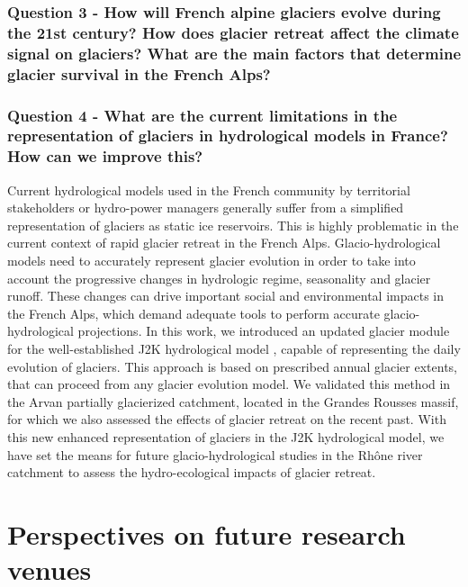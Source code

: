 \subsubsection{Question 3 - How will French alpine glaciers evolve during the 21st century? How does glacier retreat affect the climate signal on glaciers? What are the main factors that determine glacier survival in the French Alps?}

\blindtext

\subsubsection{Question 4 - What are the current limitations in the representation of glaciers in hydrological models in France? How can we improve this?}

Current hydrological models used in the French community by territorial stakeholders or hydro-power managers generally suffer from a simplified representation of glaciers as static ice reservoirs. This is highly problematic in the current context of rapid glacier retreat in the French Alps. Glacio-hydrological models need to accurately represent glacier evolution in order to take into account the progressive changes in hydrologic regime, seasonality and glacier runoff. These changes can drive important social and environmental impacts in the French Alps, which demand adequate tools to perform accurate glacio-hydrological projections. In this work, we introduced an updated glacier module for the well-established J2K hydrological model \citep{krause_quantifying_2002}, capable of representing the daily evolution of glaciers. This approach is based on prescribed annual glacier extents, that can proceed from any glacier evolution model. We validated this method in the Arvan partially glacierized catchment, located in the Grandes Rousses massif, for which we also assessed the effects of glacier retreat on the recent past. With this new enhanced representation of glaciers in the J2K hydrological model, we have set the means for future glacio-hydrological studies in the Rhône river catchment to assess the hydro-ecological impacts of glacier retreat. 

\section{Perspectives on future research venues}

